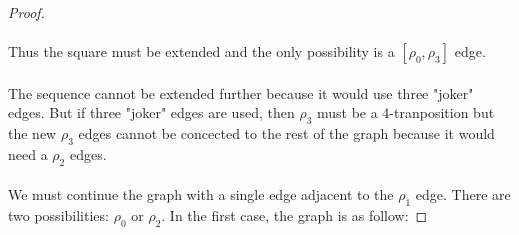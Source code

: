 \begin{proof}
  \paragraph{}
  Thus the square must be extended and the only possibility is a $[\rho_0, \rho_3]$ edge.

  \begin{figure}[H]
    \begin{center}
      \caption{}
    \end{center}
  \end{figure}

  \paragraph{}
  The sequence cannot be extended further because it would use three "joker" edges. But if three "joker" edges are used, then $\rho_3$ must be a 4-tranposition but the new $\rho_3$ edges cannot be concected to the rest of the graph because it would need a $\rho_2$ edges.

  \paragraph{}
  We must continue the graph with a single edge adjacent to the $\rho_1$ edge. There are two possibilities: $\rho_0$ or $\rho_2$. In the first case, the graph is as follow:


\end{proof}
